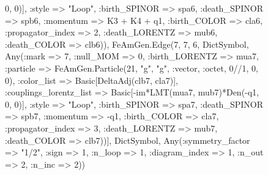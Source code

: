 \documentclass{revtex4}
\begin{document}
\begin{figure}[!htb]
\begin{center}
{0, 0)], :style => "Loop", :birth_SPINOR => spa6, :death_SPINOR => spb6, :momentum => K3 + K4 + q1, :birth_COLOR => cla6, :propagator_index => 2, :death_LORENTZ => mub6, :death_COLOR => clb6)), FeAmGen.Edge(7, 7, 6, Dict{Symbol, Any}(:mark => 7, :null_MOM => 0, :birth_LORENTZ => mua7, :particle => FeAmGen.Particle(21, "g", "g", :vector, :octet, 0//1, 0, 0), :color_list => Basic[DeltaAdj(clb7, cla7)], :couplings_lorentz_list => Basic[-im*LMT(mua7, mub7)*Den(-q1, 0, 0)], :style => "Loop", :birth_SPINOR => spa7, :death_SPINOR => spb7, :momentum => -q1, :birth_COLOR => cla7, :propagator_index => 3, :death_LORENTZ => mub7, :death_COLOR => clb7))], Dict{Symbol, Any}(:symmetry_factor => "1/2", :sign => 1, :n_loop => 1, :diagram_index => 1, :n_out => 2, :n_inc => 2)) 
}
\end{center}
\end{figure}
\end{document}
